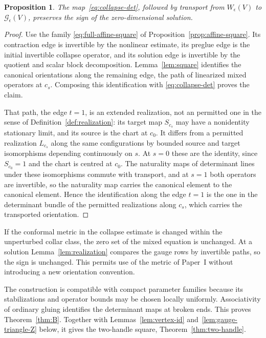 \documentclass[11pt]{amsart}
\newtheorem{proposition}[theorem]{Proposition}
\theoremstyle{definition}
\theoremstyle{remark}
\theoremstyle{plain}
\numberwithin{equation}{section}
\begin{document}
\begin{proposition}\label{prop:collapse-sign}
The map~\eqref{eq:collapse-det}, followed by transport
from $W_\epsilon(V)$ to $\mathcal G_\epsilon(V)$, preserves
the sign of the zero-dimensional solution.
\end{proposition}
\begin{proof}
Use the family \eqref{eq:full-affine-square} of
Proposition~\ref{prop:affine-square}. Its contraction edge is
invertible by the nonlinear estimate, its preglue edge is the
initial invertible collapse operator, and its solution edge is
invertible by the quotient and scalar block decomposition.
Lemma~\ref{lem:square} identifies the canonical orientations
along the remaining edge, the path of linearized mixed operators at
$c_s$. Composing this
identification with \eqref{eq:collapse-det} proves the claim.

That path, the edge $t=1$, is an extended realization, not an
permitted one in the sense of Definition~\ref{def:realization}: its
target map $S_{c_s}$ may have a nonidentity stationary limit, and its
source is the chart at $c_0$. It differs from a permitted realization
$L_{c_s}$ along the same configurations by bounded source and target
isomorphisms depending continuously on $s$. At $s=0$ these are the
identity, since $S_{c_0}=1$ and the chart is centred at $c_0$. The
naturality maps of determinant lines under these isomorphisms commute
with transport, and at $s=1$ both operators are invertible, so the
naturality map carries the canonical element to the canonical element.
Hence the identification along the edge $t=1$ is the one in the
determinant bundle of the permitted realizations along $c_s$, which carries the
transported orientation.
\end{proof}

If the conformal metric in the collapse estimate is
changed within the unperturbed collar class, the zero
set of the mixed equation is unchanged. At a solution
Lemma~\ref{lem:realization} compares the gauge rows by
invertible paths, so the sign is unchanged. This permits
use of the metric of Paper~I without introducing a new
orientation convention.

The construction is compatible with compact parameter
families because its stabilizations and operator
bounds may be chosen locally uniformly. Associativity
of ordinary gluing identifies the determinant maps at
broken ends. This proves Theorem~\ref{thm:B}. Together with
Lemmas~\ref{lem:vertex-id} and~\ref{lem:gauge-triangle-Z} below, it gives
the two-handle square, Theorem~\ref{thm:two-handle}.
\end{document}
